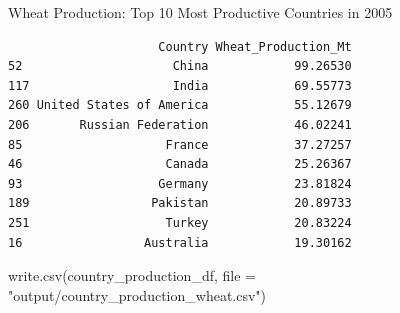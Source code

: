 \documentclass[
  ignorenonframetext,
  aspectratio=169,
]{beamer}
\newenvironment{Shaded}{\begin{snugshade}}{\end{snugshade}}
\newcommand{\AttributeTok}[1]{\textcolor[rgb]{0.40,0.45,0.13}{#1}}
\newcommand{\ConstantTok}[1]{\textcolor[rgb]{0.56,0.35,0.01}{#1}}
\newcommand{\DecValTok}[1]{\textcolor[rgb]{0.68,0.00,0.00}{#1}}
\newcommand{\FunctionTok}[1]{\textcolor[rgb]{0.28,0.35,0.67}{#1}}
\newcommand{\NormalTok}[1]{\textcolor[rgb]{0.00,0.23,0.31}{#1}}
\newcommand{\OtherTok}[1]{\textcolor[rgb]{0.00,0.23,0.31}{#1}}
\newcommand{\SpecialCharTok}[1]{\textcolor[rgb]{0.37,0.37,0.37}{#1}}
\newcommand{\StringTok}[1]{\textcolor[rgb]{0.13,0.47,0.30}{#1}}
\begin{document}
\begin{frame}[fragile]{Wheat Production: Top 10 Most Productive
Countries in 2005}
\protect\hypertarget{wheat-production-top-10-most-productive-countries-in-2005}{}
\linespread{0.5}

\begin{Shaded}
\end{Shaded}

\linespread{2}

\linespread{0.5}

\begin{Shaded}
\end{Shaded}

\begin{verbatim}
                     Country Wheat_Production_Mt
52                     China            99.26530
117                    India            69.55773
260 United States of America            55.12679
206       Russian Federation            46.02241
85                    France            37.27257
46                    Canada            25.26367
93                   Germany            23.81824
189                 Pakistan            20.89733
251                   Turkey            20.83224
16                 Australia            19.30162
\end{verbatim}

\begin{Shaded}
\begin{Highlighting}[]
\FunctionTok{write.csv}\NormalTok{(country\_production\_df, }\AttributeTok{file =} \StringTok{"output/country\_production\_wheat.csv"}\NormalTok{)}
\end{Highlighting}
\end{Shaded}

\linespread{2}
\end{frame}
\end{document}
